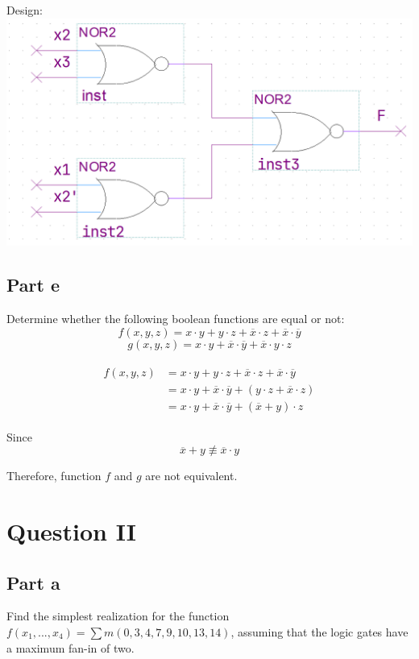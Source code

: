 \documentclass[12pt, a4paper]{article}
\begin{document}
	Design:\\
	\includegraphics[scale=0.5]{1d.png}
	
	
	\subsection*{Part e}
	Determine whether the following boolean functions are equal or not:
	\begin{equation}
		f(x, y, z) = x \cdot y + y \cdot z + \overline{x} \cdot z + \overline{x} \cdot \overline{y}
	\end{equation}
	\begin{equation}
		g(x, y, z) = x \cdot y + \overline{x} \cdot \overline{y} + \overline{x} \cdot y \cdot z
	\end{equation}

	\begin{align*}
		\begin{split}
			f(x, y, z)
			&= x \cdot y + y \cdot z + \overline{x} \cdot z + \overline{x} \cdot \overline{y} \\
			&= x \cdot y + \overline{x} \cdot \overline{y} + (y \cdot z + \overline{x} \cdot z) \\
			&= x \cdot y + \overline{x} \cdot \overline{y} + (\overline{x} + y) \cdot z
		\end{split}
	\end{align*}
	
	Since
	$$\overline{x} + y \not\equiv \overline{x} \cdot y$$
	
	Therefore, function $f$ and $g$ are not equivalent.
	
	\section*{Question II}
	\subsection*{Part a}
	Find the simplest realization for the function $f(x_1, ..., x_4) = {\sum{m(0, 3, 4, 7, 9, 10, 13, 14)}}$, assuming that the logic gates have a maximum fan-in of two.
\end{document}
